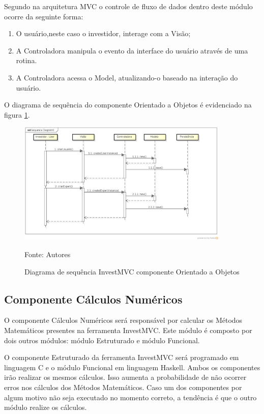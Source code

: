 Segundo  na arquitetura MVC o controle de fluxo de dados dentro deste módulo ocorre da seguinte forma:

\begin{enumerate}
\item O usuário,neste caso o investidor, interage com a Visão;
\item A Controladora manipula o evento da interface do usuário através de uma rotina.
\item A Controladora acessa o Model, atualizando-o baseado na interação do usuário.
\end{enumerate}

O diagrama de sequência do componente Orientado a Objetos é evidenciado na figura \ref{sequenciaOO}.

\begin{figure}[htp]
\centering
\includegraphics[width=0.9\textwidth]{figuras/sequenciaOO}
\caption{Diagrama de sequência InvestMVC componente Orientado a Objetos}{Fonte: Autores}
\label{sequenciaOO}
\end{figure}

\subsection{Componente Cálculos Numéricos}

O componente Cálculos Numéricos será responsável por calcular os Métodos Matemáticos presentes na ferramenta InvestMVC. Este módulo é composto por dois outros módulos: módulo Estruturado e módulo Funcional.

O componente Estruturado da ferramenta InvestMVC será programado em linguagem C e o módulo Funcional em linguagem Haskell. Ambos os componentes irão realizar os mesmos cálculos. Isso aumenta a probabilidade de não ocorrer erros nos cálculos dos Métodos Matemáticos. Caso um dos componentes por algum motivo não seja executado no momento correto, a tendência é que o outro módulo realize os cálculos.

